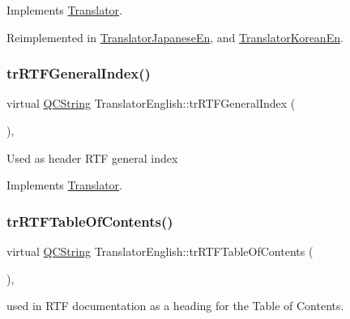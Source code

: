 Implements \mbox{\hyperlink{class_translator_afad391f3cbfb5ce6332b7239f8e2049a}{Translator}}.



Reimplemented in \mbox{\hyperlink{class_translator_japanese_en_aff3e71dc3a1d71f056fea3299c8a427e}{Translator\+Japanese\+En}}, and \mbox{\hyperlink{class_translator_korean_en_ad0ac561385e4e2583eb5f3aaf5303f4d}{Translator\+Korean\+En}}.

\mbox{\label{class_translator_english_ae6d05d92d3111427944e230387f07c76}} 
\subsubsection{\texorpdfstring{trRTFGeneralIndex()}{trRTFGeneralIndex()}}
{\footnotesize\ttfamily virtual \mbox{\hyperlink{class_q_c_string}{Q\+C\+String}} Translator\+English\+::tr\+R\+T\+F\+General\+Index (\begin{DoxyParamCaption}{ }\end{DoxyParamCaption})\hspace{0.3cm}{\ttfamily [inline]}, {\ttfamily [virtual]}}

Used as header R\+TF general index 

Implements \mbox{\hyperlink{class_translator}{Translator}}.

\mbox{\label{class_translator_english_a09940c02b248afb3501a0e69c3a20496}} 
\subsubsection{\texorpdfstring{trRTFTableOfContents()}{trRTFTableOfContents()}}
{\footnotesize\ttfamily virtual \mbox{\hyperlink{class_q_c_string}{Q\+C\+String}} Translator\+English\+::tr\+R\+T\+F\+Table\+Of\+Contents (\begin{DoxyParamCaption}{ }\end{DoxyParamCaption})\hspace{0.3cm}{\ttfamily [inline]}, {\ttfamily [virtual]}}

used in R\+TF documentation as a heading for the Table of Contents. 

